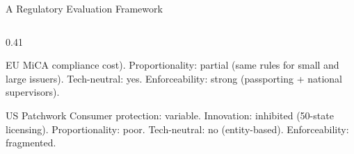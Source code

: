 \begin{frame}{A Regulatory Evaluation Framework}
\begin{columns}[T]
\begin{column}{0.41\textwidth}
\begin{block}{EU MiCA}
        compliance cost). Proportionality: partial (same rules for
        small and large issuers). Tech-neutral: yes. Enforceability:
        strong (passporting + national supervisors).
      \end{block}
      \vspace{0.25em}
      \begin{block}{US Patchwork}
        Consumer protection: variable. Innovation: inhibited
        (50-state licensing). Proportionality: poor. Tech-neutral: no
        (entity-based). Enforceability: fragmented.
      \end{block}
    \end{column}
  \end{columns}
\end{frame}

